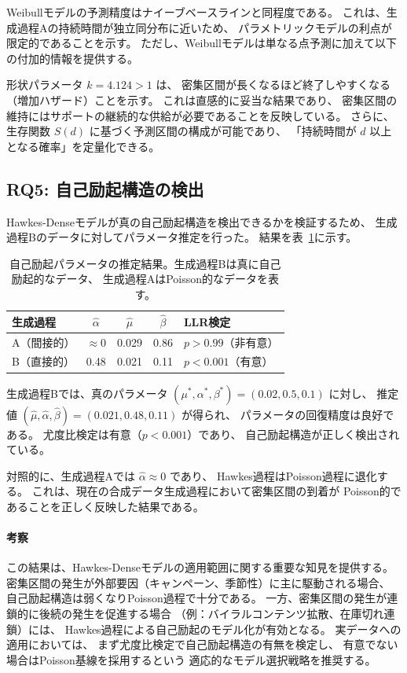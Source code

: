 Weibullモデルの予測精度はナイーブベースラインと同程度である。
これは、生成過程Aの持続時間が独立同分布に近いため、
パラメトリックモデルの利点が限定的であることを示す。
ただし、Weibullモデルは単なる点予測に加えて以下の付加的情報を提供する。

形状パラメータ $k = 4.124 > 1$ は、
密集区間が長くなるほど終了しやすくなる（増加ハザード）ことを示す。
これは直感的に妥当な結果であり、
密集区間の維持にはサポートの継続的な供給が必要であることを反映している。
さらに、生存関数 $S(d)$ に基づく予測区間の構成が可能であり、
「持続時間が $d$ 以上となる確率」を定量化できる。

\subsection{RQ5: 自己励起構造の検出}\label{subsec:rq5}

Hawkes-Denseモデルが真の自己励起構造を検出できるかを検証するため、
生成過程Bのデータに対してパラメータ推定を行った。
結果を表~\ref{tab:selfexcite}に示す。

\begin{table}[t]
  \centering
  \caption{自己励起パラメータの推定結果。生成過程Bは真に自己励起的なデータ、
  生成過程AはPoisson的なデータを表す。}
  \label{tab:selfexcite}
  \begin{tabular}{lcccl}
    \toprule
    生成過程 & $\hat{\alpha}$ & $\hat{\mu}$ & $\hat{\beta}$ & LLR検定 \\
    \midrule
    A（間接的） & $\approx 0$ & 0.029 & 0.86 & $p > 0.99$（非有意） \\
    B（直接的） & 0.48 & 0.021 & 0.11 & $p < 0.001$（有意） \\
    \bottomrule
  \end{tabular}
\end{table}

生成過程Bでは、真のパラメータ $(\mu^*, \alpha^*, \beta^*) = (0.02, 0.5, 0.1)$ に対し、
推定値 $(\hat{\mu}, \hat{\alpha}, \hat{\beta}) = (0.021, 0.48, 0.11)$ が得られ、
パラメータの回復精度は良好である。
尤度比検定は有意（$p < 0.001$）であり、
自己励起構造が正しく検出されている。

対照的に、生成過程Aでは $\hat{\alpha} \approx 0$ であり、
Hawkes過程はPoisson過程に退化する。
これは、現在の合成データ生成過程において密集区間の到着が
Poisson的であることを正しく反映した結果である。

\paragraph{考察}
この結果は、Hawkes-Denseモデルの適用範囲に関する重要な知見を提供する。
密集区間の発生が外部要因（キャンペーン、季節性）に主に駆動される場合、
自己励起構造は弱くなりPoisson過程で十分である。
一方、密集区間の発生が連鎖的に後続の発生を促進する場合
（例：バイラルコンテンツ拡散、在庫切れ連鎖）には、
Hawkes過程による自己励起のモデル化が有効となる。
実データへの適用においては、
まず尤度比検定で自己励起構造の有無を検定し、
有意でない場合はPoisson基線を採用するという
適応的なモデル選択戦略を推奨する。

